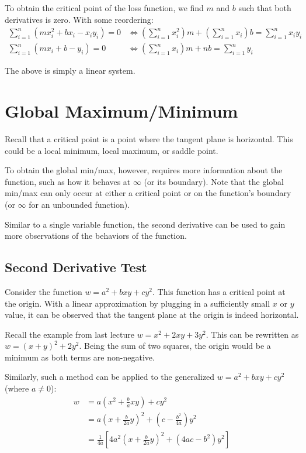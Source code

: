 \documentclass[12pt]{article}
\theoremstyle{definition}
\begin{document}
	To obtain the critical point of the loss function, we find $m$ and $b$ such that both derivatives is zero. With some reordering:
	\begin{align*}
		\sum^n_{i=1} \left(mx^2_i + bx_i - x_iy_i \right) = 0 &\iff \left(\sum^n_{i=1}x^2_i \right)m + \left(\sum^n_{i=1}x_i \right) b = \sum^n_{i=1}x_iy_i\\
		\sum^n_{i=1} (mx_i + b - y_i) = 0 &\iff \left(\sum^n_{i=1} x_i\right)m + nb = \sum^n_{i=1} y_i
	\end{align*}
	
	The above is simply a linear system.
	
	\section{Global Maximum/Minimum}
	
	Recall that a critical point is a point where the tangent plane is horizontal. This could be a local minimum, local maximum, or saddle point.
	
	To obtain the global min/max, however, requires more information about the function, such as how it behaves at $\infty$ (or its boundary). Note that the global min/max can only occur at either a critical point or on the function's boundary (or $\infty$ for an unbounded function).
	
	Similar to a single variable function, the second derivative can be used to gain more observations of the behaviors of the function.
	
	\subsection{Second Derivative Test}
	
	Consider the function $w = a^2 + bxy + cy^2$. This function has a critical point at the origin. With a linear approximation by plugging in a sufficiently small $x$ or $y$ value, it can be observed that the tangent plane at the origin is indeed horizontal.
	
	Recall the example from last lecture $w = x^2 + 2xy + 3y^2$. This can be rewritten as $w = (x + y)^2 + 2y^2$. Being the sum of two squares, the origin would be a minimum as both terms are non-negative.
	
	Similarly, such a method can be applied to the generalized $w = a^2 + bxy + cy^2$ (where $a \neq 0$):
	\begin{align*}
		w &= a(x^2 + \frac{b}{a}xy) + cy^2 \\
		&= a(x + \frac{b}{2a}y)^2 + (c - \frac{b^2}{4a})y^2 \\
		&= \frac{1}{4a}[4a^2(x+\frac{b}{2a}y)^2 + (4ac-b^2)y^2]
	\end{align*}
	
\end{document}
